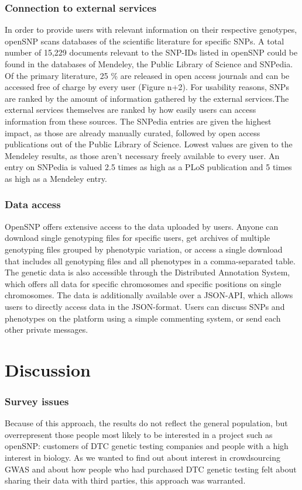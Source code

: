 \documentclass[10pt]{article}
\begin{document}
\subsubsection*{Connection to external services}
In order to provide users with relevant information on their respective genotypes, openSNP scans databases of the scientific literature for specific SNPs. A total number of 15,229 documents relevant to the SNP-IDs listed in openSNP could be found in the databases of Mendeley, the Public Library of Science and SNPedia. Of the primary literature, 25 \% are released in open access journals and can be accessed free of charge by every user (Figure n+2). For usability reasons, SNPs are ranked by the amount of information gathered by the external services.The external services themselves are ranked by how easily users can access information from these sources. The SNPedia entries are given the highest impact, as those are already manually curated, followed by open access publications out of the Public Library of Science. Lowest values are given to the Mendeley results, as those aren't necessary freely available to every user. An entry on SNPedia is valued 2.5 times as high as a PLoS publication and 5 times as high as a Mendeley entry.  

\subsubsection*{Data access}
OpenSNP offers extensive access to the data uploaded by users. Anyone can download single genotyping files for specific users, get archives of multiple genotyping files grouped by phenotypic variation, or access a single download that includes all genotyping files and all phenotypes in a comma-separated table. The genetic data is also accessible through the Distributed Annotation System, which offers all data for specific chromosomes and specific positions on single chromosomes. The data is additionally available over a JSON-API, which allows users to directly access data in the JSON-format. Users can discuss SNPs and phenotypes on the platform using a simple commenting system, or send each other private messages. 

\section*{Discussion}

\subsubsection*{Survey issues}
Because of this approach, the results do not reflect the general population, but overrepresent those people most likely to be interested in a project such as openSNP: customers of DTC genetic testing companies and people with a high interest in biology. As we wanted to find out about interest in crowdsourcing GWAS and about how people who had purchased DTC genetic testing felt about sharing their data with third parties, this approach was warranted.
\end{document}
